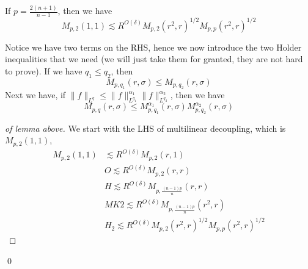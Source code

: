 \begin{lemma}
    If $p=\frac{2(n+1)}{n-1}$, then we have
    \begin{equation*}
        M_{p,2}(1,1)\lesssim R^{O(\delta)}M_{p,2}(r^2,r)^{1/2}M_{p,p}(r^2,r)^{1/2}
    \end{equation*}
\end{lemma}
Notice we have two terms on the RHS, hence we now introduce the two Holder inequalities that we need (we will just take them for granted, they are not hard to prove).
If we have $q_1\leq q_2$, then
\begin{equation*}
    M_{p,q_1}(r,\sigma)\leq M_{p,q_2}(r,\sigma)
\end{equation*}
Next we have, if $\|f\|_{L^q}\leq\|f\|_{L^{q_1}}^{\alpha_1}\|f\|_{L^{q_2}}^{\alpha_2}$, then we have
\begin{equation*}
    M_{p,q}(r,\sigma)\leq M_{p,q_1}^{\alpha_1}(r, \sigma)M_{p,q_2}^{\alpha_2}(r,\sigma)
\end{equation*}
\begin{proof}[of lemma above]
    We start with the LHS of multilinear decoupling, which is $M_{p,2}(1,1)$,
    \begin{align*}
        M_{p,2}(1,1)&\lesssim R^{O(\delta)}M_{p,2}(r,1)\\
        & O \lesssim R^{O(\delta)}M_{p,2}(r,r)\\
        & H \lesssim R^{O(\delta)}M_{p,\frac{(n-1)p}{n}}(r,r)\\
        & MK2 \lesssim R^{O(\delta)}M_{p,\frac{(n-1)p}{n}}(r^2,r)\\
        & H_2 \lesssim R^{O(\delta)} M_{p,2}(r^2,r)^{1/2}M_{p,p}(r^2,r)^{1/2}
    \end{align*}
\end{proof}
\qed
